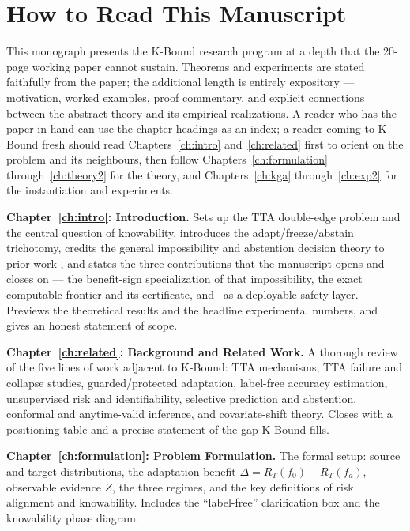 \chapter*{How to Read This Manuscript}

This monograph presents the K-Bound research program at a depth that the
20-page working paper cannot sustain.
Theorems and experiments are stated faithfully from the paper; the additional
length is entirely expository --- motivation, worked examples, proof commentary,
and explicit connections between the abstract theory and its empirical realizations.
A reader who has the paper in hand can use the chapter headings as an index;
a reader coming to K-Bound fresh should read Chapters~\ref{ch:intro}
and~\ref{ch:related} first to orient on the problem and its neighbours, then
follow Chapters~\ref{ch:formulation} through~\ref{ch:theory2} for the theory,
and Chapters~\ref{ch:kga} through~\ref{ch:exp2} for the instantiation and
experiments.

\medskip
\noindent\textbf{Chapter~\ref{ch:intro}: Introduction.}
Sets up the TTA double-edge problem and the central question of knowability,
introduces the adapt/freeze/abstain trichotomy, credits the general impossibility and
abstention decision theory to prior work \cite{garg2022atc,kalai2021abstain}, and
states the three contributions that the manuscript opens and closes on --- the
benefit-sign specialization of that impossibility, the exact computable frontier and its
certificate, and \KGA\ as a deployable safety layer. Previews the theoretical results
and the headline experimental numbers, and gives an honest statement of scope.

\medskip
\noindent\textbf{Chapter~\ref{ch:related}: Background and Related Work.}
A thorough review of the five lines of work adjacent to K-Bound: TTA mechanisms,
TTA failure and collapse studies, guarded/protected adaptation, label-free
accuracy estimation, unsupervised risk and identifiability, selective prediction
and abstention, conformal and anytime-valid inference, and covariate-shift theory.
Closes with a positioning table and a precise statement of the gap K-Bound fills.

\medskip
\noindent\textbf{Chapter~\ref{ch:formulation}: Problem Formulation.}
The formal setup: source and target distributions, the adaptation benefit
$\Delta = R_T(f_0) - R_T(f_a)$, observable evidence $Z$, the three regimes, and
the key definitions of risk alignment and knowability.
Includes the ``label-free'' clarification box and the knowability phase diagram.

